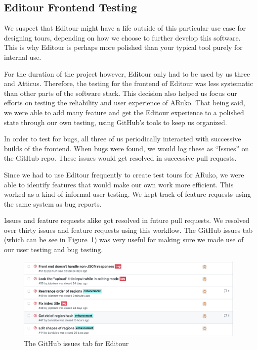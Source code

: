 \documentclass[a4paper, 10pt, american, titlepage]{article}
\begin{document}
\subsection{Editour Frontend Testing}
\label{sec:editourFrontendTesting}

We suspect that Editour might have a life outside of this particular use case
for designing tours, depending on how we choose to further develop this
software. This is why Editour is perhaps more polished than your typical tool
purely for internal use.

For the duration of the project however, Editour only had to be used by us
three and Atticus. Therefore, the testing for the frontend of Editour was less
systematic than other parts of the software stack. This decision also helped us
focus our efforts on testing the reliability and user experience of ARuko. That
being said, we were able to add many feature and get the Editour experience to
a polished state through our own testing, using GitHub's tools to keep us
organized.

In order to test for bugs, all three of us periodically interacted with
successive builds of the frontend. When bugs were found, we would log these as
``Issues'' on the GitHub repo. These issues would get resolved in successive
pull requests.

Since we had to use Editour frequently to create test tours for ARuko, we were
able to identify features that would make our own work more efficient. This
worked as a kind of informal user testing. We kept track of feature requests
using the same system as bug reports.

Issues and feature requests alike got resolved in future pull requests. We
resolved over thirty issues and feature requests using this workflow. The
GitHub issues tab (which can be see in Figure~\ref{fig:issuesPageExample}) was
very useful for making sure we made use of our user testing and bug testing.

\begin{figure}[h]
	\centering
	\includegraphics[width=\textwidth]{issues-page-example.png}
	\caption{The GitHub issues tab for Editour}
	\label{fig:issuesPageExample}
\end{figure}
\end{document}
